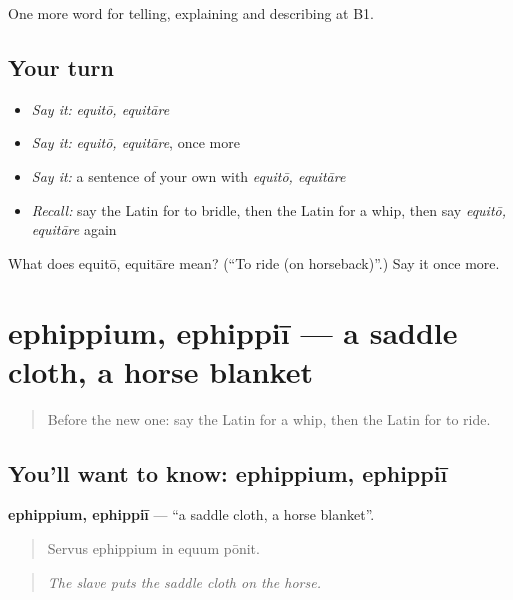\begin{grammarlens}[title={What you've built}]
One more word for telling, explaining and describing at B1.
\end{grammarlens}

\subsection*{Your turn}
\begin{itemize}
\raggedright
  \item \emph{Say it:} \emph{equitō, equitāre}
  \item \emph{Say it:} \emph{equitō, equitāre}, once more
  \item \emph{Say it:} a sentence of your own with \emph{equitō, equitāre}
  \item \emph{Recall:} say the Latin for to bridle, then the Latin for a whip, then say \emph{equitō, equitāre} again
\end{itemize}

\begin{tcolorbox}[breakable,colback=teal!4,colframe=teal!35!black,title={Before you move on}]
What does equitō, equitāre mean? (\textquotedblleft{}To ride (on horseback)\textquotedblright{}.) Say it once more.
\end{tcolorbox}
\section[ephippium, ephippiī]{ephippium, ephippiī — a saddle cloth, a horse blanket}

\label{lesson:LA-C432-ephippium}



\begin{quote}
Before the new one: say the Latin for a whip, then the Latin for to ride.
\end{quote}

\subsection*{You'll want to know: ephippium, ephippiī}
\textbf{ephippium, ephippiī} — \textquotedblleft{}a saddle cloth, a horse blanket\textquotedblright{}.

\begin{quote}
Servus ephippium in equum pōnit.
\end{quote}

\begin{quote}
\emph{The slave puts the saddle cloth on the horse.}
\end{quote}

